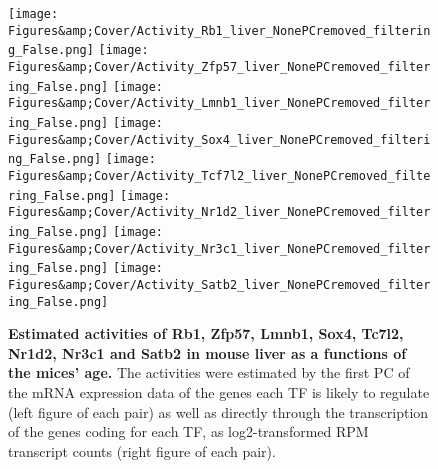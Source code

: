 \begin{figure}
    \centering
    \texttt{[image: Figures\&amp;Cover/Activity\_Rb1\_liver\_NonePCremoved\_filtering\_False.png]}
    \hspace{0.25cm}
    \vspace{0.25cm}
    \texttt{[image: Figures\&amp;Cover/Activity\_Zfp57\_liver\_NonePCremoved\_filtering\_False.png]}
    \vspace{0.25cm}
    \texttt{[image: Figures\&amp;Cover/Activity\_Lmnb1\_liver\_NonePCremoved\_filtering\_False.png]}
    \hspace{0.25cm}
    \texttt{[image: Figures\&amp;Cover/Activity\_Sox4\_liver\_NonePCremoved\_filtering\_False.png]}
    \vspace{0.25cm}
    \texttt{[image: Figures\&amp;Cover/Activity\_Tcf7l2\_liver\_NonePCremoved\_filtering\_False.png]}
    \hspace{0.25cm}
    \texttt{[image: Figures\&amp;Cover/Activity\_Nr1d2\_liver\_NonePCremoved\_filtering\_False.png]}
    \vspace{0.25cm}
    \texttt{[image: Figures\&amp;Cover/Activity\_Nr3c1\_liver\_NonePCremoved\_filtering\_False.png]}
    \hspace{0.25cm}
    \texttt{[image: Figures\&amp;Cover/Activity\_Satb2\_liver\_NonePCremoved\_filtering\_False.png]}
    \caption{\textbf{Estimated activities of Rb1, Zfp57, Lmnb1, Sox4, Tc7l2, Nr1d2, Nr3c1 and Satb2 in mouse liver as a functions of the mices' age.} The activities were estimated by the first \ac{PC} of the mRNA expression data of the genes each \ac{TF} is likely to regulate (left figure of each pair) as well as directly through the transcription of the genes coding for each \ac{TF}, as log2-transformed \ac{RPM} transcript counts (right figure of each pair).}
    \label{fig:LiverEsts2}
\end{figure}


